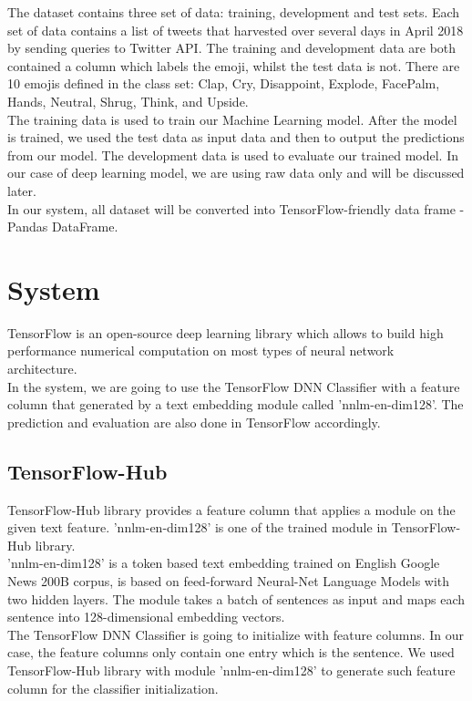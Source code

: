 \documentclass[12pt]{article}
\begin{document}
The dataset contains three set of data: training, development and test sets. Each set of data contains a list of tweets that harvested over several days in April 2018 by sending queries to Twitter API. The training and development data are both contained a column which labels the emoji, whilst the test data is not. There are 10 emojis defined in the class set: Clap, Cry, Disappoint, Explode, FacePalm, Hands, Neutral, Shrug, Think, and Upside.
\medskip \\
The training data is used to train our Machine Learning model. After the model is trained, we used the test data as input data and then to output the predictions from our model. The development data is used to evaluate our trained model. In our case of deep learning model, we are using raw data only and will be discussed later.
\medskip \\
In our system, all dataset will be converted into TensorFlow-friendly data frame - Pandas DataFrame.

\section{System}

TensorFlow is an open-source deep learning library which allows to build high performance numerical computation on most types of neural network architecture. 
\medskip \\
In the system, we are going to use the TensorFlow DNN Classifier with a feature column that generated by a text embedding module called 'nnlm-en-dim128'. The prediction and evaluation are also done in TensorFlow accordingly.

\subsection{TensorFlow-Hub}

TensorFlow-Hub library provides a feature column that applies a module on the given text feature. 'nnlm-en-dim128' is one of the trained module in TensorFlow-Hub library.
\medskip \\
'nnlm-en-dim128' is a token based text embedding trained on English Google News 200B corpus, is based on feed-forward Neural-Net Language Models \cite{nnlm} with two hidden layers. The module takes a batch of sentences as input and maps each sentence into 128-dimensional embedding vectors.
\medskip \\
The TensorFlow DNN Classifier is going to initialize with feature columns. In our case, the feature columns only contain one entry which is the sentence. We used TensorFlow-Hub library with module 'nnlm-en-dim128' to generate such feature column for the classifier initialization.
\end{document}
